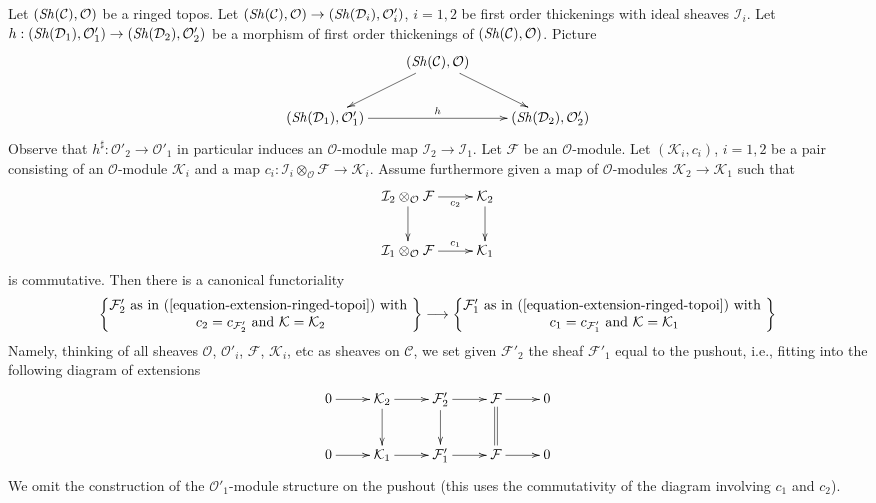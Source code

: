 \begin{remark}
\label{remark-extension-functorial-ringed-topoi}
Let $(\mathop{\mathit{Sh}}\nolimits(\mathcal{C}), \mathcal{O})$ be a ringed topos. Let
$(\mathop{\mathit{Sh}}\nolimits(\mathcal{C}), \mathcal{O}) \to (\mathop{\mathit{Sh}}\nolimits(\mathcal{D}_i), \mathcal{O}'_i)$,
$i = 1, 2$ be first order thickenings with ideal sheaves $\mathcal{I}_i$.
Let $h : (\mathop{\mathit{Sh}}\nolimits(\mathcal{D}_1), \mathcal{O}'_1) \to
(\mathop{\mathit{Sh}}\nolimits(\mathcal{D}_2), \mathcal{O}'_2)$
be a morphism of first order thickenings of $(\mathop{\mathit{Sh}}\nolimits(\mathcal{C}), \mathcal{O})$.
Picture
$$
\xymatrix{
& (\Sh(\mathcal{C}), \mathcal{O}) \ar[ld] \ar[rd] & \\
(\Sh(\mathcal{D}_1), \mathcal{O}'_1) \ar[rr]^h & & 
(\Sh(\mathcal{D}_2), \mathcal{O}'_2)
}
$$
Observe that $h^\sharp : \mathcal{O}'_2 \to \mathcal{O}'_1$
in particular induces an $\mathcal{O}$-module map
$\mathcal{I}_2 \to \mathcal{I}_1$.
Let $\mathcal{F}$ be an $\mathcal{O}$-module.
Let $(\mathcal{K}_i, c_i)$, $i = 1, 2$ be a pair
consisting of an $\mathcal{O}$-module $\mathcal{K}_i$ and a map
$c_i : \mathcal{I}_i \otimes_\mathcal{O} \mathcal{F} \to
\mathcal{K}_i$. Assume furthermore given a map
of $\mathcal{O}$-modules $\mathcal{K}_2 \to \mathcal{K}_1$
such that
$$
\xymatrix{
\mathcal{I}_2 \otimes_\mathcal{O} \mathcal{F}
\ar[r]_-{c_2} \ar[d] &
\mathcal{K}_2 \ar[d] \\
\mathcal{I}_1 \otimes_\mathcal{O} \mathcal{F}
\ar[r]^-{c_1} &
\mathcal{K}_1
}
$$
is commutative. Then there is a canonical functoriality
$$
\left\{
\begin{matrix}
\mathcal{F}'_2\text{ as in (\ref{equation-extension-ringed-topoi}) with }\\
c_2 = c_{\mathcal{F}'_2}\text{ and }\mathcal{K} = \mathcal{K}_2
\end{matrix}
\right\}
\longrightarrow
\left\{
\begin{matrix}
\mathcal{F}'_1\text{ as in (\ref{equation-extension-ringed-topoi}) with }\\
c_1 = c_{\mathcal{F}'_1}\text{ and }\mathcal{K} = \mathcal{K}_1
\end{matrix}
\right\}
$$
Namely, thinking of all sheaves $\mathcal{O}$, $\mathcal{O}'_i$,
$\mathcal{F}$, $\mathcal{K}_i$, etc as sheaves on $\mathcal{C}$, we set
given $\mathcal{F}'_2$ the sheaf $\mathcal{F}'_1$ equal to the
pushout, i.e., fitting into the following diagram of extensions
$$
\xymatrix{
0 \ar[r] &
\mathcal{K}_2 \ar[r] \ar[d] &
\mathcal{F}'_2 \ar[r] \ar[d] &
\mathcal{F} \ar@{=}[d] \ar[r] & 0 \\
0 \ar[r] &
\mathcal{K}_1 \ar[r] &
\mathcal{F}'_1 \ar[r] &
\mathcal{F} \ar[r] & 0
}
$$
We omit the construction of the $\mathcal{O}'_1$-module structure
on the pushout (this uses the commutativity of the diagram
involving $c_1$ and $c_2$).
\end{remark}

